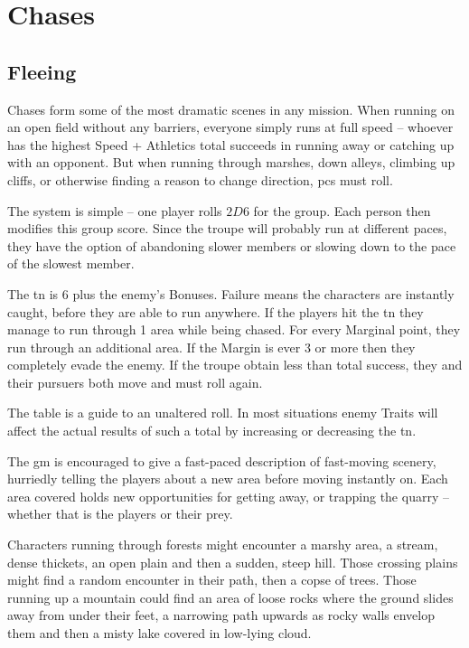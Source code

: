 \section{Chases}
\label{chases}

\begin{multicols}{2}

\begin{figure*}[t]
\chasechart
\end{figure*}

\subsection{Fleeing}

Chases form some of the most dramatic scenes in any mission.
When running on an open field without any barriers, everyone simply runs at full speed -- whoever has the highest Speed + Athletics total succeeds in running away or catching up with an opponent.
But when running through marshes, down alleys, climbing up cliffs, or otherwise finding a reason to change direction, \glspl{pc} must roll.

The system is simple -- one player rolls $2D6$ for the group.
Each person then modifies this group score.
Since the troupe will probably run at different paces, they have the option of abandoning slower members or slowing down to the pace of the slowest member.

The \gls{tn} is 6 plus the enemy's  Bonuses.
Failure means the characters are instantly caught, before they are able to run anywhere.
If the players hit the \gls{tn} they manage to run through 1 area while being chased.
For every Marginal point, they run through an additional area.
If the Margin is ever 3 or more then they completely evade the enemy.
If the troupe obtain less than total success, they and their pursuers both move and must roll again.

The table is a guide to an unaltered roll. In most situations enemy Traits will affect the actual results of such a total by increasing or decreasing the \gls{tn}.

The \gls{gm} is encouraged to give a fast-paced description of fast-moving scenery, hurriedly telling the players about a new area before moving instantly on.
Each area covered holds new opportunities for getting away, or trapping the quarry -- whether that is the players or their prey.

Characters running through forests might encounter a marshy area, a stream, dense thickets, an open plain and then a sudden, steep hill.
Those crossing plains might find a random encounter in their path, then a copse of trees.
Those running up a mountain could find an area of loose rocks where the ground slides away from under their feet, a narrowing path upwards as rocky walls envelop them and then a misty lake covered in low-lying cloud.


\end{multicols}
